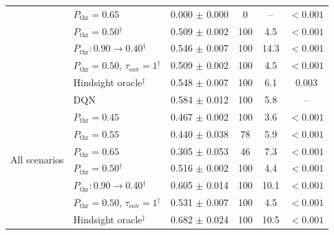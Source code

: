 \begin{table}[htbp]
\begin{tabular}{llcccc}
 & $P_{\mathrm{thr}}=0.65$ & 0.000 $\pm$ 0.000 & 0 & -- & $<0.001$ \\
 & $P_{\mathrm{thr}}=0.50$$^{\dagger}$ & 0.509 $\pm$ 0.002 & 100 & 4.5 & $<0.001$ \\
 & $P_{\mathrm{thr}}: 0.90 \to 0.40$$^{\dagger}$ & 0.546 $\pm$ 0.007 & 100 & 14.3 & $<0.001$ \\
 & $P_{\mathrm{thr}}=0.50$, $\tau_{\mathrm{cov}}=1$$^{\dagger}$ & 0.509 $\pm$ 0.002 & 100 & 4.5 & $<0.001$ \\
 & Hindsight oracle$^{\ddagger}$ & 0.548 $\pm$ 0.007 & 100 & 6.1 & 0.003 \\
\midrule
\multirow{8}{*}{All scenarios} & DQN & 0.584 $\pm$ 0.012 & 100 & 5.8 & -- \\
 & $P_{\mathrm{thr}}=0.45$ & 0.467 $\pm$ 0.002 & 100 & 3.6 & $<0.001$ \\
 & $P_{\mathrm{thr}}=0.55$ & 0.440 $\pm$ 0.038 & 78 & 5.9 & $<0.001$ \\
 & $P_{\mathrm{thr}}=0.65$ & 0.305 $\pm$ 0.053 & 46 & 7.3 & $<0.001$ \\
 & $P_{\mathrm{thr}}=0.50$$^{\dagger}$ & 0.516 $\pm$ 0.002 & 100 & 4.4 & $<0.001$ \\
 & $P_{\mathrm{thr}}: 0.90 \to 0.40$$^{\dagger}$ & 0.605 $\pm$ 0.014 & 100 & 10.1 & $<0.001$ \\
 & $P_{\mathrm{thr}}=0.50$, $\tau_{\mathrm{cov}}=1$$^{\dagger}$ & 0.531 $\pm$ 0.007 & 100 & 4.5 & $<0.001$ \\
 & Hindsight oracle$^{\ddagger}$ & 0.682 $\pm$ 0.024 & 100 & 10.5 & $<0.001$ \\
\bottomrule
\end{tabular}
\end{table}
